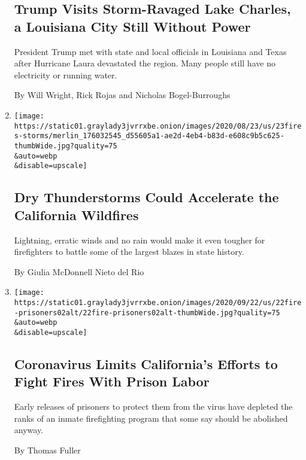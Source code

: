 \begin{enumerate}
{  \subsection{Trump Visits Storm-Ravaged Lake Charles, a Louisiana City
  Still Without
  Power}\label{trump-visits-storm-ravaged-lake-charles-a-louisiana-city-still-without-power}}

  President Trump met with state and local officials in Louisiana and
  Texas after Hurricane Laura devastated the region. Many people still
  have no electricity or running water.

  By Will Wright, Rick Rojas and Nicholas Bogel-Burroughs
\item
  \href{/2020/08/23/us/dry-thunderstorms-california-fires.html}{}

  \texttt{[image: https://static01.graylady3jvrrxbe.onion/images/2020/08/23/us/23fires-storms/merlin\_176032545\_d55605a1-ae2d-4eb4-b83d-e608c9b5c625-thumbWide.jpg?quality=75\\\&auto=webp\\\&disable=upscale]}

  \hypertarget{dry-thunderstorms-could-accelerate-the-california-wildfires}{%
  \subsection{Dry Thunderstorms Could Accelerate the California
  Wildfires}\label{dry-thunderstorms-could-accelerate-the-california-wildfires}}

  Lightning, erratic winds and no rain would make it even tougher for
  firefighters to battle some of the largest blazes in state history.

  By Giulia McDonnell Nieto del Rio
\item
  \href{/2020/08/22/us/california-wildfires-prisoners.html}{}

  \texttt{[image: https://static01.graylady3jvrrxbe.onion/images/2020/09/22/us/22fire-prisoners02alt/22fire-prisoners02alt-thumbWide.jpg?quality=75\\\&auto=webp\\\&disable=upscale]}

  \hypertarget{coronavirus-limits-californias-efforts-to-fight-fires-with-prison-labor}{%
  \subsection{Coronavirus Limits California's Efforts to Fight Fires
  With Prison
  Labor}\label{coronavirus-limits-californias-efforts-to-fight-fires-with-prison-labor}}

  Early releases of prisoners to protect them from the virus have
  depleted the ranks of an inmate firefighting program that some say
  should be abolished anyway.

  By Thomas Fuller
\end{enumerate}


